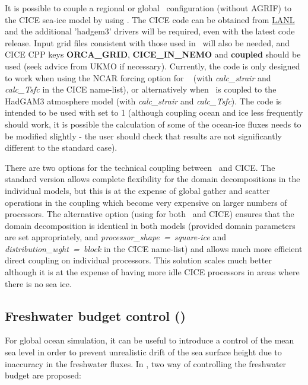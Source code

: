 \documentclass[../main/NEMO_manual]{subfiles}
\begin{document}
It is possible to couple a regional or global \NEMO\ configuration (without AGRIF)
to the CICE sea-ice model by using .
The CICE code can be obtained from \href{http://oceans11.lanl.gov/trac/CICE/}{LANL} and
the additional 'hadgem3' drivers will be required, even with the latest code release.
Input grid files consistent with those used in \NEMO\ will also be needed,
and CICE CPP keys \textbf{ORCA\_GRID}, \textbf{CICE\_IN\_NEMO} and \textbf{coupled} should be used
(seek advice from UKMO if necessary).
Currently, the code is only designed to work when using the NCAR forcing option for \NEMO\ %
(with \textit{calc\_strair} and \textit{calc\_Tsfc} in the CICE name-list),
or alternatively when \NEMO\ is coupled to the HadGAM3 atmosphere model
(with \textit{calc\_strair} and \textit{calc\_Tsfc}).
The code is intended to be used with  set to 1
(although coupling ocean and ice less frequently should work,
it is possible the calculation of some of the ocean-ice fluxes needs to be modified slightly -
the user should check that results are not significantly different to the standard case).

There are two options for the technical coupling between \NEMO\ and CICE.
The standard version allows complete flexibility for the domain decompositions in the individual models,
but this is at the expense of global gather and scatter operations in the coupling which
become very expensive on larger numbers of processors.
The alternative option (using  for both \NEMO\ and CICE) ensures that
the domain decomposition is identical in both models (provided domain parameters are set appropriately,
and \textit{processor\_shape~=~square-ice} and \textit{distribution\_wght~=~block} in the CICE name-list) and
allows much more efficient direct coupling on individual processors.
This solution scales much better although it is at the expense of having more idle CICE processors in areas where
there is no sea ice.

\subsection[Freshwater budget control (\textit{sbcfwb.F90})]{Freshwater budget control (\protect{})}
\label{subsec:SBC_fwb}

For global ocean simulation, it can be useful to introduce a control of the mean sea level in order to
prevent unrealistic drift of the sea surface height due to inaccuracy in the freshwater fluxes.
In \NEMO, two way of controlling the freshwater budget are proposed:
\end{document}
